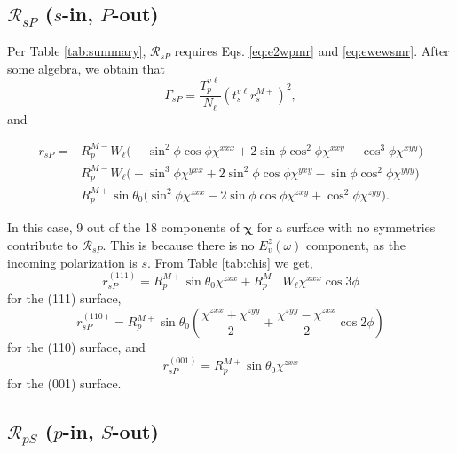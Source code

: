 \documentclass[aps,prb,10pt,showpacs,letterpaper,twocolumn]{revtex4-1}
\begin{document}
\subsection{\texorpdfstring{$\mathcal{R}_{sP}$ ($s$-in, $P$-out)} {RsP (s-in,
P-out)}}
\label{sec:RsP}

Per Table \ref{tab:summary}, $\mathcal{R}_{sP}$ requires Eqs. \eqref{eq:e2wpmr}
and \eqref{eq:ewewsmr}. After some algebra, we obtain that
\begin{equation}\label{mcv4}
\Gamma_{sP}=
\frac{T^{v\ell}_{p}}{N_{\ell}}
\left(t^{v\ell}_{s}r^{M+}_{s}\right)^{2},
\end{equation}
and
\begin{widetext}
\begin{equation}
\begin{split}
r_{sP} = 
& R^{M-}_{p}W_{\ell}
\big(
- \sin^{2}\phi\cos\phi\chi^{xxx}
+ 2\sin\phi\cos^{2}\phi\chi^{xxy}
- \cos^{3}\phi\chi^{xyy}
\big)\\
& R^{M-}_{p}W_{\ell}
\big(
- \sin^{3}\phi\chi^{yxx}
+ 2\sin^{2}\phi\cos\phi\chi^{yxy}
- \sin\phi\cos^{2}\phi\chi^{yyy}
\big)\\
& R^{M+}_{p}\sin\theta_{0}
\big(
  \sin^{2}\phi\chi^{zxx}
- 2\sin\phi\cos\phi\chi^{zxy}
+ \cos^{2}\phi\chi^{zyy}
\big).
\end{split}
\end{equation}
\end{widetext}
In this case, 9 out of the 18 components of $\boldsymbol{\chi}$ for a surface
with no symmetries contribute to $\mathcal{R}_{sP}$. This is because there is no
$E^z_v(\omega)$ component, as the incoming polarization is $s$. From Table
\ref{tab:chis} we get,
\begin{equation}\label{eq:rsp111}
r^{(111)}_{sP} = 
R^{M+}_{p}\sin\theta_{0}\chi^{zxx} +
R^{M-}_{p}W_{\ell}\chi^{xxx}\cos3\phi
\end{equation}
for the (111) surface,
\begin{equation}\label{eq:rsp110}
r^{(110)}_{sP} = 
R^{M+}_{p}\sin\theta_{0}
\left(
\frac{\chi^{zxx} + \chi^{zyy}}{2} + \frac{\chi^{zyy} - \chi^{zxx}}{2}\cos2\phi
\right)
\end{equation}
for the (110) surface, and
\begin{equation}\label{eq:rsp001}
r^{(001)}_{sP} = R^{M+}_{p}\sin\theta_{0}\chi^{zxx}
\end{equation}
for the (001) surface.

\subsection{\texorpdfstring{$\mathcal{R}_{pS}$ ($p$-in, $S$-out)} {RpS (p-in,
S-out)}}
\label{sec:RpS}
\end{document}
